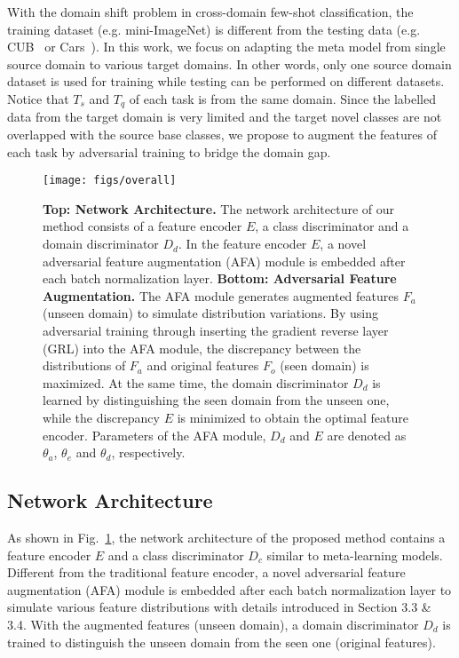 \documentclass[runningheads]{utils/llncs}
\begin{document}
With the domain shift problem in cross-domain few-shot classification, the training dataset (e.g. mini-ImageNet) is different from the testing data (e.g. CUB~\cite{welinder2010caltech} or Cars~\cite{Krause0DF13}).
In this work, we focus on adapting the meta model from single source domain to various target domains. 
In other words, only one source domain dataset is used for training while testing can be performed on different datasets. 
Notice that $T_s$ and $T_q$ of each task is from the same domain.
Since the labelled data from the target domain is very limited and the target novel classes are not overlapped with the source base classes, we propose to augment the features of each task by adversarial training to bridge the domain gap.





\begin{figure}[t]
\begin{center}
\texttt{[image: figs/overall]}
\end{center}

   \caption{{\bf Top: Network Architecture.} 
   The network architecture of our method consists of a feature encoder $E$, a class discriminator and a domain discriminator $D_d$. 
   In the feature encoder $E$, a novel adversarial feature augmentation (AFA) module is embedded after each batch normalization layer.
   {\bf Bottom: Adversarial Feature Augmentation.} 
The AFA module generates augmented features $F_a$ (unseen domain) to simulate distribution variations.
   By using adversarial training through inserting the gradient reverse layer (GRL) into the AFA module, the discrepancy between the distributions of $F_a$ and original features $F_o$ (seen domain) is maximized.
At the same time, the domain discriminator $D_d$ is learned by distinguishing the seen domain from the unseen one, while the discrepancy $E$ is minimized to obtain the optimal feature encoder.
   Parameters of the AFA module, $D_d$ and $E$ are denoted as $\theta_a$, $\theta_e$ and $\theta_d$, respectively. 
   }
\label{figure1}
\end{figure} 
\subsection{Network Architecture}
As shown in Fig.~\ref{figure1}, the network architecture of the proposed method contains a feature encoder $E$ and a class discriminator $D_c$ similar to meta-learning models.
Different from the traditional feature encoder, a novel adversarial feature augmentation (AFA) module is embedded after each batch normalization layer to simulate various feature distributions with details introduced in Section 3.3 \& 3.4.
With the augmented features (unseen domain), a domain discriminator $D_d$ is trained to distinguish the unseen domain from the seen one (original features).
\end{document}
